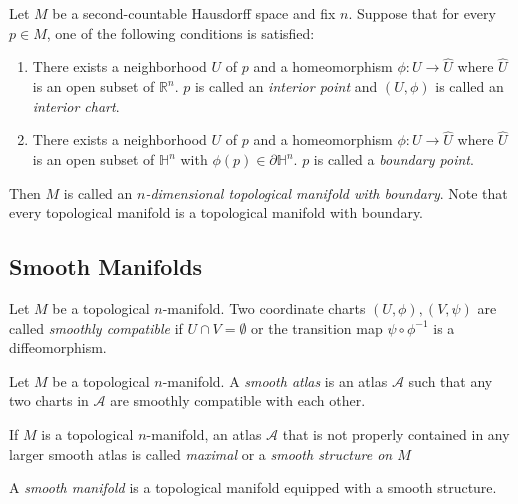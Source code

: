 \begin{defn}
  Let $M$ be a second-countable Hausdorff space and fix $n$.
  Suppose that for every $p \in M$, one of the following conditions is satisfied:
  \begin{enumerate}
    \item
      There exists a neighborhood $U$ of $p$ and a homeomorphism $\phi:U \rightarrow \hat{U}$ where $\hat{U}$ is an open subset of $\mathbb{R}^n$.
      $p$ is called an \textit{interior point} and $(U, \phi)$ is called an \textit{interior chart}.
    \item
      There exists a neighborhood $U$ of $p$ and a homeomorphism $\phi:U \rightarrow \hat{U}$ where $\hat{U}$ is an open subset of $\mathbb{H}^n$ with $\phi(p) \in \partial \mathbb{H}^n$.
      $p$ is called a \textit{boundary point}.
  \end{enumerate}
  Then $M$ is called an \textit{$n$-dimensional topological manifold with boundary}.
  Note that every topological manifold is a topological manifold with boundary.
\end{defn}


\subsection{Smooth Manifolds}

\begin{defn}
  Let $M$ be a topological $n$-manifold.
  Two coordinate charts $(U, \phi), (V, \psi)$ are called \textit{smoothly compatible} if $U \cap V = \emptyset$ or the transition map $\psi \circ \phi^{-1}$ is a diffeomorphism.
\end{defn}

\begin{defn}
  Let $M$ be a topological $n$-manifold.
  A \textit{smooth atlas} is an atlas $\mathcal{A}$ such that any two charts in $\mathcal{A}$ are smoothly compatible with each other.
\end{defn}

\begin{defn}
  If $M$ is a topological $n$-manifold, an atlas $\mathcal{A}$ that is not properly contained in any larger smooth atlas is called \textit{maximal} or a \textit{smooth structure on $M$}
\end{defn}

\begin{defn}
  A \textit{smooth manifold} is a topological manifold equipped with a smooth structure.
\end{defn}

